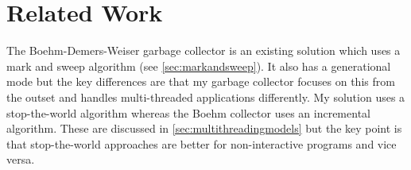\documentclass[../diss.tex]{subfiles}
\begin{document}
\section{Related Work} \label{sec:furtherwork}

The Boehm-Demers-Weiser garbage collector\cite{boehmgc} is an existing solution which uses a mark and sweep algorithm (see \cref{sec:markandsweep}). It also has a generational mode but the key differences are that my garbage collector focuses on this from the outset and handles multi-threaded applications differently. My solution uses a stop-the-world algorithm whereas the Boehm collector uses an incremental algorithm. These are discussed in \cref{sec:multithreadingmodels} but the key point is that stop-the-world approaches are better for non-interactive programs and vice versa.
\end{document}
